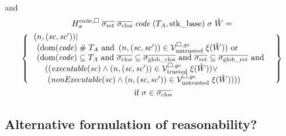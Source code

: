\documentclass[a4paper]{article}
\begin{document}
and
\begin{multline*}
  H^\mathrm{code,\square}_\sigma \; \sigrets \; \sigcloss \; \code \;
  (\ta,\stkb) \; \sigma \; \hat{W}= \\
  \left\{
    \begin{array}{l}
\left. \npair{(\vsc, \vsc' )} \middle| \right. \\
      \begin{array}{l}
        (\dom(\code) \mathrel{\#} \ta \tand \npair{(\vsc,\vsc')} \in \lrv \; \xi(\hat{W})) \tor\\
        (\dom(\code) \subseteq \ta \tand \sigcloss \subseteq \gsigcloss \tand \sigrets \subseteq \gsigrets \tand \\
         \quad((\exec{\vsc} \wedge \npair{(\vsc,\vsc')} \in \lrvtrusted \; \xi(\hat{W})) \vee\\
         \quad\ (\nonExec{\vsc} \wedge\npair{(\vsc,\vsc')} \in \lrv \; \xi(\hat{W}))))
      \end{array}
    \end{array}
  \right\}\\
  \text{ if } \sigma \in \sigcloss
\end{multline*}

\subsection{Alternative formulation of reasonability?}
\label{sec:reasonability}
\end{document}
